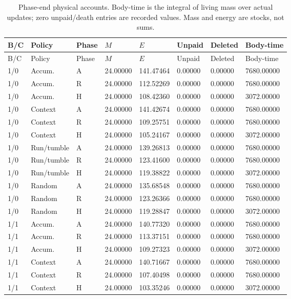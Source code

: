 \begin{longtable}{llllllll}
\caption{Phase-end physical accounts. Body-time is the integral of living mass over actual updates; zero unpaid/death entries are recorded values. Mass and energy are stocks, not sums.}\label{tab:scalar-physical}\\
\toprule
B/C & Policy & Phase & $M$ & $E$ & Unpaid & Deleted & Body-time \\
\midrule
\endfirsthead
\toprule
B/C & Policy & Phase & $M$ & $E$ & Unpaid & Deleted & Body-time \\
\midrule
\endhead
1/0 & Accum. & A & 24.00000 & 141.47464 & 0.00000 & 0.00000 & 7680.00000 \\
1/0 & Accum. & R & 24.00000 & 112.52269 & 0.00000 & 0.00000 & 7680.00000 \\
1/0 & Accum. & H & 24.00000 & 108.42360 & 0.00000 & 0.00000 & 3072.00000 \\
1/0 & Context & A & 24.00000 & 141.42674 & 0.00000 & 0.00000 & 7680.00000 \\
1/0 & Context & R & 24.00000 & 109.25751 & 0.00000 & 0.00000 & 7680.00000 \\
1/0 & Context & H & 24.00000 & 105.24167 & 0.00000 & 0.00000 & 3072.00000 \\
1/0 & Run/tumble & A & 24.00000 & 139.26813 & 0.00000 & 0.00000 & 7680.00000 \\
1/0 & Run/tumble & R & 24.00000 & 123.41600 & 0.00000 & 0.00000 & 7680.00000 \\
1/0 & Run/tumble & H & 24.00000 & 119.38822 & 0.00000 & 0.00000 & 3072.00000 \\
1/0 & Random & A & 24.00000 & 135.68548 & 0.00000 & 0.00000 & 7680.00000 \\
1/0 & Random & R & 24.00000 & 123.26366 & 0.00000 & 0.00000 & 7680.00000 \\
1/0 & Random & H & 24.00000 & 119.28847 & 0.00000 & 0.00000 & 3072.00000 \\
1/1 & Accum. & A & 24.00000 & 140.77320 & 0.00000 & 0.00000 & 7680.00000 \\
1/1 & Accum. & R & 24.00000 & 113.37151 & 0.00000 & 0.00000 & 7680.00000 \\
1/1 & Accum. & H & 24.00000 & 109.27323 & 0.00000 & 0.00000 & 3072.00000 \\
1/1 & Context & A & 24.00000 & 140.71667 & 0.00000 & 0.00000 & 7680.00000 \\
1/1 & Context & R & 24.00000 & 107.40498 & 0.00000 & 0.00000 & 7680.00000 \\
1/1 & Context & H & 24.00000 & 103.35246 & 0.00000 & 0.00000 & 3072.00000 \\

\end{longtable}
